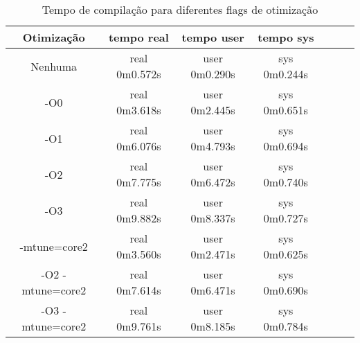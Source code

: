 \documentclass[10pt,a4paper]{article}
\begin{document}
\begin{table}[h!]
  \caption{Tempo de compilação para diferentes flags de otimização}
  \begin{center}
    \begin{tabular}{ccccccc}

      Otimização& tempo real& tempo user& tempo sys\\
      \hline 
      Nenhuma  &  real	0m0.572s & user	0m0.290s& sys	0m0.244s\\

      -O0&
      real	0m3.618s&
      user	0m2.445s&
      sys	0m0.651s\\

      -O1&
      real	0m6.076s&
      user	0m4.793s&
      sys	0m0.694s\\

      -O2&
      real	0m7.775s&
      user	0m6.472s&
      sys	0m0.740s\\

      -O3&
      real	0m9.882s&
      user	0m8.337s&
      sys	0m0.727s\\

  -mtune=core2 &
      real	0m3.560s&
      user	0m2.471s&
      sys	0m0.625s\\

      -O2 -mtune=core2 &
      real	0m7.614s&
      user	0m6.471s&
      sys	0m0.690s\\

      -O3 -mtune=core2&
      real	0m9.761s&
      user	0m8.185s&
      sys	0m0.784s

    \end{tabular}
  \end{center}
\end{table}




    

\end{document}
